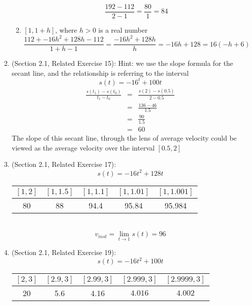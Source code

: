 \documentclass{article}
\begin{document}
\begin{enumerate}
\begin{enumerate}
    	        $$\frac{192 - 112}{2 - 1} = \frac{80}{1} = 84$$
    	    \item $[1, 1 + h]$, where $h > 0$ is a real number
    	        $$\frac{112 + -16h^2 + 128h - 112}{1 + h - 1} = \frac{-16h^2 + 128h}{h} = -16h + 128 = 16(-h + 6)$$
        \end{enumerate}
    \item (Section 2.1, Related Exercise 15):
    	Hint: we use the slope formula for the secant line, and the relationship is referring to the interval
    	$$s(t) = -16^t + 100t$$
    	\begin{eqnarray}
    	\frac{s(t_1) - s(t_0)}{t_1 - t_0} &=& \frac{s(2) - s(0.5)}{2 - 0.5} \\
    	&=& \frac{136 - 46}{1.5} \\
    	&=& \frac{90}{1.5} \\
    	&=& 60
    	\end{eqnarray}
    	The slope of this secant line, through the lens of average velocity could be viewed as the average velocity over the interval $[0.5, 2]$
    \item (Section 2.1, Related Exercise 17):
        $$s(t) = -16t^2 + 128t$$
    
	    \begin{tabular}{| c | c | c | c | c |}
            \hline
            $[1,2]$&$[1,1.5]$&$[1,1.1]$&$[1,1.01]$&$[1,1.001]$ \\
            \hline
    	    80 & 88 & 94.4 & 95.84 & 95.984 \\
            \hline
        \end{tabular} \\

    	$$v_{inst} = \lim_{t \to 1}{s(t)} = 96$$
    \item (Section 2.1, Related Exercise 19):
	    $$s(t) = -16t^2 + 100t$$
    
	    \begin{tabular}{| c | c | c | c | c |}
            \hline
	        $[2,3]$&$[2.9,3]$&$[2.99,3]$&$[2.999,3]$&$[2.9999,3]$ \\
            \hline
	        20 & 5.6 & 4.16 & $4.016$ & $4.002$ \\
            \hline
        \end{tabular} \\
    

\end{enumerate}
\end{document}
